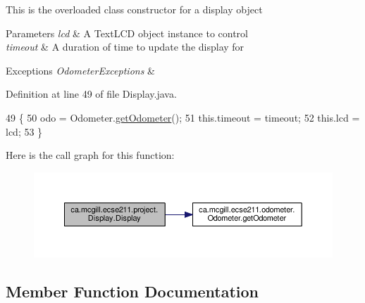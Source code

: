 This is the overloaded class constructor for a display object


\begin{DoxyParams}{Parameters}
{\em lcd} & A Text\+L\+CD object instance to control \\
\hline
{\em timeout} & A duration of time to update the display for \\
\hline
\end{DoxyParams}

\begin{DoxyExceptions}{Exceptions}
{\em Odometer\+Exceptions} & \\
\hline
\end{DoxyExceptions}


Definition at line 49 of file Display.\+java.


\begin{DoxyCode}
49                                                                       \{
50     odo = Odometer.\hyperlink{classca_1_1mcgill_1_1ecse211_1_1odometer_1_1_odometer_a99171f11e34dea918fa9dd069d721439}{getOdometer}();
51     this.timeout = timeout;
52     this.lcd = lcd;
53   \}
\end{DoxyCode}
Here is the call graph for this function\+:\nopagebreak
\begin{figure}[H]
\begin{center}
\leavevmode
\includegraphics[width=350pt]{classca_1_1mcgill_1_1ecse211_1_1project_1_1_display_a690cd91bcc8024950c2b8e3b2613c801_cgraph}
\end{center}
\end{figure}


\subsection{Member Function Documentation}
\mbox{\label{classca_1_1mcgill_1_1ecse211_1_1project_1_1_display_ab508a8bc2b738499bec2c432a814cba5}} 
